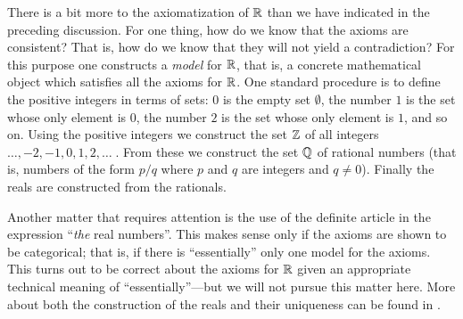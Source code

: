There is a bit more to the axiomatization of $\mathbb{R}$ than we have indicated in the preceding
discussion. For one thing, how do we know that the axioms are
consistent?  That is, how do we know that they will not yield a contradiction?  For this
purpose one constructs a \emph{model} for $\mathbb{R}$, that is, a concrete mathematical object which
satisfies all the axioms for $\mathbb{R}$. One standard procedure is to define the positive integers
in terms of sets: $0$ is the empty set $\emptyset$, the number $1$ is the set whose only
element is $0$, the number $2$ is the set whose only element is $1$, and so on. Using the
positive integers we construct the set $\mathbb{Z}$ of all integers $\dots, -2, -1 , 0, 1, 2,
\dots\;$.  From these we construct the set  $\mathbb{Q}$ of rational numbers (that is, numbers of the
form $p/q$ where $p$ and $q$ are integers and  $q \ne 0$).
Finally the reals are constructed from the rationals.

Another matter that requires attention is the use of the definite article in the expression
``\emph{the} real numbers''. This makes sense only if the axioms are shown to be
categorical; that is, if there is ``essentially'' only one model for the axioms.  This turns
out to be correct about the axioms for $\mathbb{R}$ given an appropriate technical meaning of
``essentially''---but we will not pursue this matter here.  More about both the construction
of the reals and their uniqueness can be found in \cite{Spivak:1967}.



\endinput
